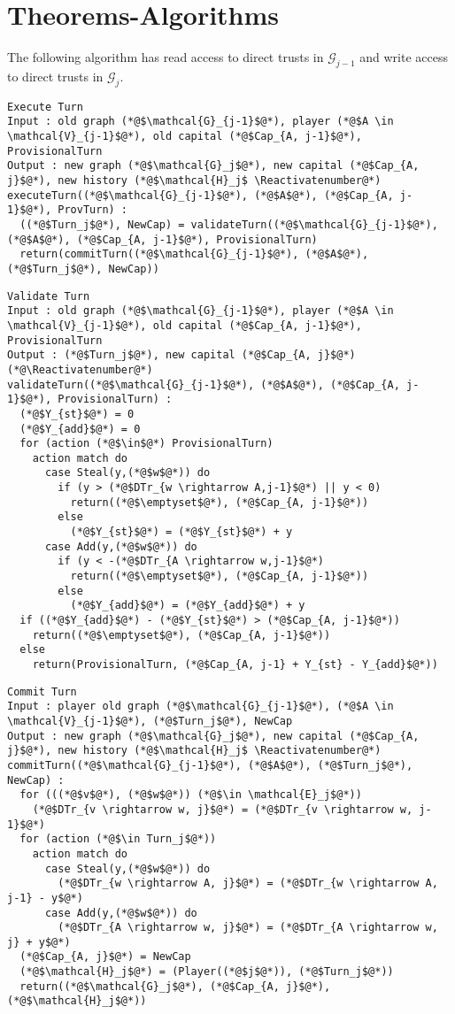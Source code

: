 \documentclass[11pt]{llncs}
\makeatletter
\newcommand*\Suppressnumber{%
  \lst@AddToHook{OnNewLine}{%
    \let\thelstnumber\relax%
     \advance\c@lstnumber-\@ne\relax%
    }%
}
\makeatother
\begin{document}
  \section{Theorems-Algorithms}
    The following algorithm has read access to direct trusts in $\mathcal{G}_{j-1}$ and write access to direct trusts in
    $\mathcal{G}_j$.
    \Suppressnumber
    \begin{lstlisting}[label=executeturn, style=numbers]
Execute Turn
Input : old graph (*@$\mathcal{G}_{j-1}$@*), player (*@$A \in \mathcal{V}_{j-1}$@*), old capital (*@$Cap_{A, j-1}$@*), ProvisionalTurn
Output : new graph (*@$\mathcal{G}_j$@*), new capital (*@$Cap_{A, j}$@*), new history (*@$\mathcal{H}_j$ \Reactivatenumber@*)
executeTurn((*@$\mathcal{G}_{j-1}$@*), (*@$A$@*), (*@$Cap_{A, j-1}$@*), ProvTurn) :
  ((*@$Turn_j$@*), NewCap) = validateTurn((*@$\mathcal{G}_{j-1}$@*), (*@$A$@*), (*@$Cap_{A, j-1}$@*), ProvisionalTurn)
  return(commitTurn((*@$\mathcal{G}_{j-1}$@*), (*@$A$@*), (*@$Turn_j$@*), NewCap))
    \end{lstlisting}
    \Suppressnumber
    \begin{lstlisting}[label=validateturn, style=numbers]
Validate Turn
Input : old graph (*@$\mathcal{G}_{j-1}$@*), player (*@$A \in \mathcal{V}_{j-1}$@*), old capital (*@$Cap_{A, j-1}$@*), ProvisionalTurn
Output : (*@$Turn_j$@*), new capital (*@$Cap_{A, j}$@*) (*@\Reactivatenumber@*)
validateTurn((*@$\mathcal{G}_{j-1}$@*), (*@$A$@*), (*@$Cap_{A, j-1}$@*), ProvisionalTurn) :
  (*@$Y_{st}$@*) = 0
  (*@$Y_{add}$@*) = 0
  for (action (*@$\in$@*) ProvisionalTurn)
    action match do
      case Steal(y,(*@$w$@*)) do
        if (y > (*@$DTr_{w \rightarrow A,j-1}$@*) || y < 0)
          return((*@$\emptyset$@*), (*@$Cap_{A, j-1}$@*))
        else
          (*@$Y_{st}$@*) = (*@$Y_{st}$@*) + y
      case Add(y,(*@$w$@*)) do
        if (y < -(*@$DTr_{A \rightarrow w,j-1}$@*)
          return((*@$\emptyset$@*), (*@$Cap_{A, j-1}$@*))
        else
          (*@$Y_{add}$@*) = (*@$Y_{add}$@*) + y
  if ((*@$Y_{add}$@*) - (*@$Y_{st}$@*) > (*@$Cap_{A, j-1}$@*))
    return((*@$\emptyset$@*), (*@$Cap_{A, j-1}$@*))
  else
    return(ProvisionalTurn, (*@$Cap_{A, j-1} + Y_{st} - Y_{add}$@*))
    \end{lstlisting}
    \Suppressnumber
    \begin{lstlisting}[label=committurn, style=numbers]
Commit Turn
Input : player old graph (*@$\mathcal{G}_{j-1}$@*), (*@$A \in \mathcal{V}_{j-1}$@*), (*@$Turn_j$@*), NewCap
Output : new graph (*@$\mathcal{G}_j$@*), new capital (*@$Cap_{A, j}$@*), new history (*@$\mathcal{H}_j$ \Reactivatenumber@*)
commitTurn((*@$\mathcal{G}_{j-1}$@*), (*@$A$@*), (*@$Turn_j$@*), NewCap) :
  for (((*@$v$@*), (*@$w$@*)) (*@$\in \mathcal{E}_j$@*))
    (*@$DTr_{v \rightarrow w, j}$@*) = (*@$DTr_{v \rightarrow w, j-1}$@*)
  for (action (*@$\in Turn_j$@*))
    action match do
      case Steal(y,(*@$w$@*)) do
        (*@$DTr_{w \rightarrow A, j}$@*) = (*@$DTr_{w \rightarrow A, j-1} - y$@*)
      case Add(y,(*@$w$@*)) do
        (*@$DTr_{A \rightarrow w, j}$@*) = (*@$DTr_{A \rightarrow w, j} + y$@*)
  (*@$Cap_{A, j}$@*) = NewCap
  (*@$\mathcal{H}_j$@*) = (Player((*@$j$@*)), (*@$Turn_j$@*))
  return((*@$\mathcal{G}_j$@*), (*@$Cap_{A, j}$@*), (*@$\mathcal{H}_j$@*))
    \end{lstlisting}
\end{document}
